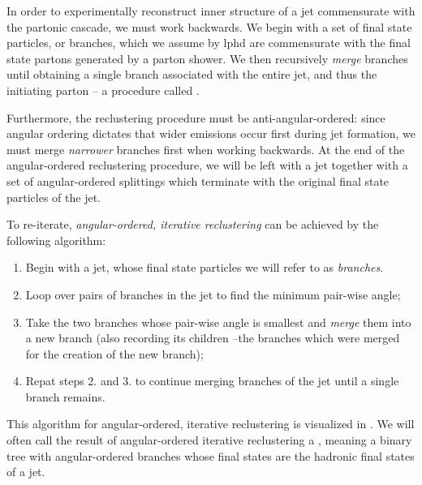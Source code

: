 In order to experimentally reconstruct inner structure of a jet commensurate with the partonic cascade, we must work backwards.
%
We begin with a set of final state particles, or branches, which we assume by \gls{lphd} are commensurate with the final state partons generated by a parton shower.
%
We then recursively \textit{merge} branches until obtaining a single branch associated with the entire jet, and thus the initiating parton -- a procedure called .



Furthermore, the \gls{reclustering} procedure must be anti-angular-ordered:
%
since angular ordering dictates that wider emissions occur first during jet formation, we must merge \textit{narrower} branches first when working backwards.
%
At the end of the angular-ordered \gls{reclustering} procedure, we will be left with a jet together with a set of angular-ordered splittings which terminate with the original final state particles of the jet.


To re-iterate, \textit{angular-ordered, iterative \gls{reclustering}} can be achieved by the following algorithm:
\begin{enumerate}
    \item
    Begin with a jet, whose final state particles we will refer to as \emph{branches}.

    \item
    Loop over pairs of branches in the jet to find the minimum pair-wise angle;

    \item
    Take the two branches whose pair-wise angle is smallest and \emph{merge} them into a new branch (also recording its children --the branches which were merged for the creation of the new branch);

    \item
    Repat steps 2. and 3. to continue merging branches of the jet until a single branch remains.
\end{enumerate}
%
This algorithm for angular-ordered, iterative \gls{reclustering} is visualized in .
%
We will often call the result of angular-ordered iterative \gls{reclustering} a , meaning a binary tree with angular-ordered branches whose final states are the hadronic final states of a jet.

\begin{figure}[]
    \centering
    \caption[Cartoons depicting re-clustering and de-clustering. ]{
    }
    \label{fig:re-and-de-clustering}
\end{figure}





